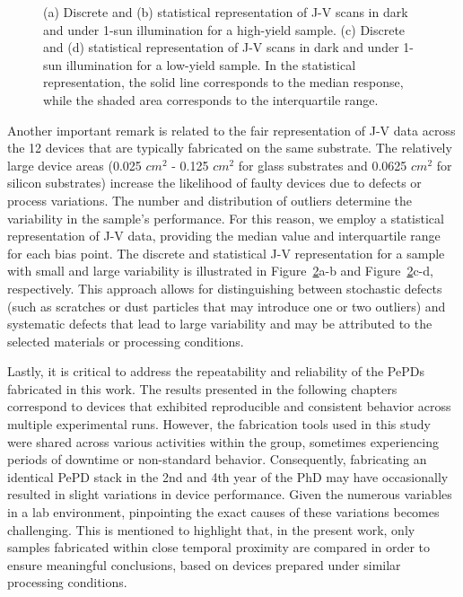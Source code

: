 \begin{figure}[ht!]
\begin{subfigure}[t]{0.4\textwidth}
        \caption{}
        \label{fig:ch2:low_yield_median}
    \end{subfigure}
    \caption[Remarks on statistical representation of electrical characterization data.]{(a) Discrete and (b) statistical representation of J-V scans in dark and under 1-sun illumination for a high-yield sample. (c) Discrete and (d) statistical representation of J-V scans in dark and under 1-sun illumination for a low-yield sample. In the statistical representation, the solid line corresponds to the median response, while the shaded area corresponds to the interquartile range.}
    \label{fig:ch2:discrete_and_median}
\end{figure}


Another important remark is related to the fair representation of J-V data across the 12 devices that are typically fabricated on the same substrate. The relatively large device areas (0.025 $cm^2$ - 0.125 $cm^2$ for glass substrates and 0.0625 $cm^2$ for silicon substrates) increase the likelihood of faulty devices due to defects or process variations. The number and distribution of outliers determine the variability in the sample's performance. For this reason,
we employ a statistical representation of J-V data, providing the median value and interquartile range for each bias point. The discrete and statistical J-V representation for a sample with small and large variability is illustrated in Figure~\ref{fig:ch2:discrete_and_median}a-b and Figure~\ref{fig:ch2:discrete_and_median}c-d, respectively. This approach allows for distinguishing between stochastic defects (such as scratches or dust particles that may introduce one or two outliers) and systematic defects that lead to large variability and may be attributed to the selected materials or processing conditions. 


Lastly, it is critical to address the repeatability and reliability of the PePDs fabricated in this work. The results presented in the following chapters correspond to devices that exhibited reproducible and consistent behavior across multiple experimental runs. However, the fabrication tools used in this study were shared across various activities within the group, sometimes experiencing periods of downtime or non-standard behavior. Consequently, fabricating an identical PePD stack in the 2nd and 4th year of the PhD may have occasionally resulted in slight variations in device performance. Given the numerous variables in a lab environment, pinpointing the exact causes of these variations becomes challenging. This is mentioned to highlight that, in the present work, only samples fabricated within close temporal proximity are compared in order to ensure meaningful conclusions, based on devices prepared under similar processing conditions.

 


\cleardoublepage

